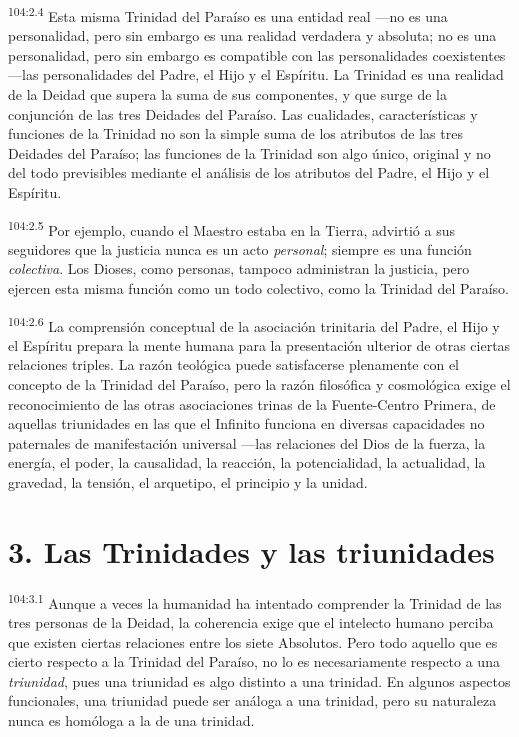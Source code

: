 \documentclass[twoside, 11pt]{book}
\begin{document}
\par
\textsuperscript{104:2.4} Esta misma Trinidad del Paraíso es una entidad real ---no es una personalidad, pero sin embargo es una realidad verdadera y absoluta; no es una personalidad, pero sin embargo es compatible con las personalidades coexistentes ---las personalidades del Padre, el Hijo y el Espíritu. La Trinidad es una realidad de la Deidad que supera la suma de sus componentes, y que surge de la conjunción de las tres Deidades del Paraíso. Las cualidades, características y funciones de la Trinidad no son la simple suma de los atributos de las tres Deidades del Paraíso; las funciones de la Trinidad son algo único, original y no del todo previsibles mediante el análisis de los atributos del Padre, el Hijo y el Espíritu.

\par
\textsuperscript{104:2.5} Por ejemplo, cuando el Maestro estaba en la Tierra, advirtió a sus seguidores que la justicia nunca es un acto \textit{personal}; siempre es una función \textit{colectiva}. Los Dioses, como personas, tampoco administran la justicia, pero ejercen esta misma función como un todo colectivo, como la Trinidad del Paraíso.

\par
\textsuperscript{104:2.6} La comprensión conceptual de la asociación trinitaria del Padre, el Hijo y el Espíritu prepara la mente humana para la presentación ulterior de otras ciertas relaciones triples. La razón teológica puede satisfacerse plenamente con el concepto de la Trinidad del Paraíso, pero la razón filosófica y cosmológica exige el reconocimiento de las otras asociaciones trinas de la Fuente-Centro Primera, de aquellas triunidades en las que el Infinito funciona en diversas capacidades no paternales de manifestación universal ---las relaciones del Dios de la fuerza, la energía, el poder, la causalidad, la reacción, la potencialidad, la actualidad, la gravedad, la tensión, el arquetipo, el principio y la unidad.

\section*{3. Las Trinidades y las triunidades}
\par
\textsuperscript{104:3.1} Aunque a veces la humanidad ha intentado comprender la Trinidad de las tres personas de la Deidad, la coherencia exige que el intelecto humano perciba que existen ciertas relaciones entre los siete Absolutos. Pero todo aquello que es cierto respecto a la Trinidad del Paraíso, no lo es necesariamente respecto a una \textit{triunidad}, pues una triunidad es algo distinto a una trinidad. En algunos aspectos funcionales, una triunidad puede ser análoga a una trinidad, pero su naturaleza nunca es homóloga a la de una trinidad.
\end{document}
